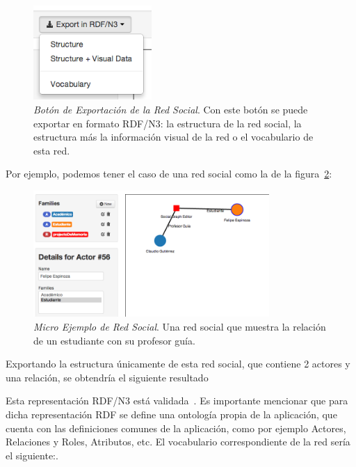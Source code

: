 \begin{figure}[H]
  \centering
  \includegraphics[width=0.4\textwidth]{images/export_button.png}
  \caption[Botón de Exportación de la Red Social]{\emph{Botón de Exportación de la Red Social}. Con este botón se puede exportar en formato RDF/N3: la estructura de la red social, la estructura más la información visual de la red o el vocabulario de esta red.}
  \label{export_button}
\end{figure}

Por ejemplo, podemos tener el caso de una red social como la de la figura~\ref{mini_red_ejemplo}:

\begin{figure}[H]
  \centering
  \includegraphics[width=0.8\textwidth]{images/mini_red_ejemplo.png}
  \caption[Micro Ejemplo de Red Social]{\emph{Micro Ejemplo de Red Social}. Una red social que muestra la relación de un estudiante con su profesor guía.}
  \label{mini_red_ejemplo}
\end{figure}


Exportando la estructura únicamente de esta red social, que contiene 2 actores y una relación, se obtendría el siguiente resultado\\


\label{lst:red_n3}

Esta representación RDF/N3 está validada~\cite{validador_rdf}. Es importante mencionar que para dicha representación RDF se define una ontología propia de la aplicación, que cuenta con las definiciones comunes de la aplicación, como por ejemplo Actores, Relaciones y Roles, Atributos, etc. El vocabulario correspondiente de la red sería el siguiente:.

